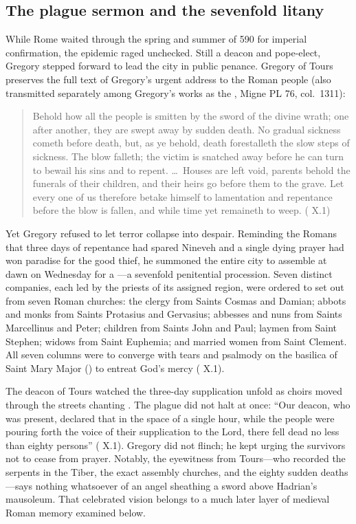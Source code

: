 \subsection{The plague sermon and the sevenfold litany}

While Rome waited through the spring and summer of 590 for imperial
confirmation, the epidemic raged unchecked. Still a deacon and pope-elect,
Gregory stepped forward to lead the city in public penance. Gregory of Tours
preserves the full text of Gregory's urgent address to the Roman people (also
transmitted separately among Gregory's works as the , Migne PL 76, col.~1311):

\begin{quote}
Behold how all the people is smitten by the sword of the divine wrath; one
after another, they are swept away by sudden death. No gradual sickness cometh
before death, but, as ye behold, death forestalleth the slow steps of sickness.
The blow falleth; the victim is snatched away before he can turn to bewail his
sins and to repent. \dots\ Houses are left void, parents behold the funerals of
their children, and their heirs go before them to the grave. Let every one of
us therefore betake himself to lamentation and repentance before the blow is
fallen, and while time yet remaineth to weep. ( X.1)
\end{quote}

Yet Gregory refused to let terror collapse into despair. Reminding the Romans
that three days of repentance had spared Nineveh and a single dying prayer had
won paradise for the good thief, he summoned the entire city to assemble at
dawn on Wednesday for a ---a sevenfold penitential
procession. Seven distinct companies, each led by the priests of its assigned
region, were ordered to set out from seven Roman churches: the clergy from
Saints Cosmas and Damian; abbots and monks from Saints Protasius and Gervasius;
abbesses and nuns from Saints Marcellinus and Peter; children from Saints John
and Paul; laymen from Saint Stephen; widows from Saint Euphemia; and married
women from Saint Clement. All seven columns were to converge with tears and
psalmody on the basilica of Saint Mary Major () to entreat God's
mercy ( X.1).

The deacon of Tours watched the three-day supplication unfold as choirs moved
through the streets chanting . The plague did not halt at
once: ``Our deacon, who was present, declared that in the space of a single
hour, while the people were pouring forth the voice of their supplication to
the Lord, there fell dead no less than eighty persons'' ( X.1). Gregory did not flinch; he kept urging the survivors not to
cease from prayer. Notably, the eyewitness from Tours---who recorded the
serpents in the Tiber, the exact assembly churches, and the eighty sudden
deaths---says nothing whatsoever of an angel sheathing a sword above Hadrian's
mausoleum. That celebrated vision belongs to a much later layer of medieval
Roman memory examined below.

